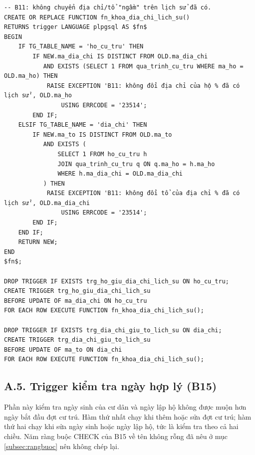 \begin{lstlisting}[style=sqlvn, caption={Trigger giữ địa chỉ của lịch sử (B11)}, label={lst:pl_b11}]
-- B11: không chuyển địa chỉ/tổ "ngầm" trên lịch sử đã có.
CREATE OR REPLACE FUNCTION fn_khoa_dia_chi_lich_su()
RETURNS trigger LANGUAGE plpgsql AS $fn$
BEGIN
    IF TG_TABLE_NAME = 'ho_cu_tru' THEN
        IF NEW.ma_dia_chi IS DISTINCT FROM OLD.ma_dia_chi
           AND EXISTS (SELECT 1 FROM qua_trinh_cu_tru WHERE ma_ho = OLD.ma_ho) THEN
            RAISE EXCEPTION 'B11: không đổi địa chỉ của hộ % đã có lịch sử', OLD.ma_ho
                USING ERRCODE = '23514';
        END IF;
    ELSIF TG_TABLE_NAME = 'dia_chi' THEN
        IF NEW.ma_to IS DISTINCT FROM OLD.ma_to
           AND EXISTS (
               SELECT 1 FROM ho_cu_tru h
               JOIN qua_trinh_cu_tru q ON q.ma_ho = h.ma_ho
               WHERE h.ma_dia_chi = OLD.ma_dia_chi
           ) THEN
            RAISE EXCEPTION 'B11: không đổi tổ của địa chỉ % đã có lịch sử', OLD.ma_dia_chi
                USING ERRCODE = '23514';
        END IF;
    END IF;
    RETURN NEW;
END
$fn$;

DROP TRIGGER IF EXISTS trg_ho_giu_dia_chi_lich_su ON ho_cu_tru;
CREATE TRIGGER trg_ho_giu_dia_chi_lich_su
BEFORE UPDATE OF ma_dia_chi ON ho_cu_tru
FOR EACH ROW EXECUTE FUNCTION fn_khoa_dia_chi_lich_su();

DROP TRIGGER IF EXISTS trg_dia_chi_giu_to_lich_su ON dia_chi;
CREATE TRIGGER trg_dia_chi_giu_to_lich_su
BEFORE UPDATE OF ma_to ON dia_chi
FOR EACH ROW EXECUTE FUNCTION fn_khoa_dia_chi_lich_su();
\end{lstlisting}

\subsection*{A.5. Trigger kiểm tra ngày hợp lý (B15)}

Phần này kiểm tra ngày sinh của cư dân và ngày lập hộ không được muộn hơn ngày bắt đầu đợt cư trú. Hàm thứ nhất chạy khi thêm hoặc sửa đợt cư trú; hàm thứ hai chạy khi sửa ngày sinh hoặc ngày lập hộ, tức là kiểm tra theo cả hai chiều. Năm ràng buộc CHECK của B15 về tên không rỗng đã nêu ở mục \ref{subsec:rangbuoc} nên không chép lại.

